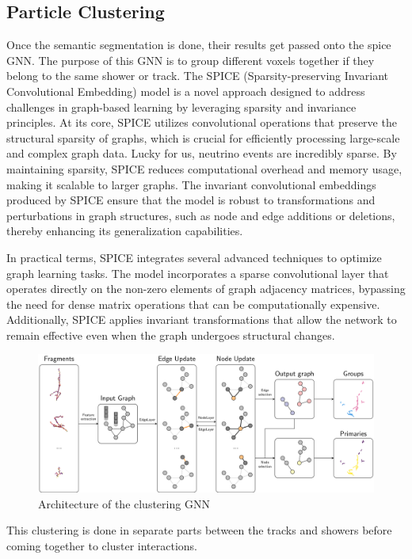 \subsection{Particle Clustering}

Once the semantic segmentation is done, their results get passed onto the spice GNN.
The purpose of this GNN is to group different voxels together if they belong to the same shower or track.
The SPICE (Sparsity-preserving Invariant Convolutional Embedding) model is a novel approach designed to address challenges in graph-based learning by leveraging sparsity and invariance principles.
At its core, SPICE utilizes convolutional operations that preserve the structural sparsity of graphs, which is crucial for efficiently processing large-scale and complex graph data.
Lucky for us, neutrino events are incredibly sparse.
By maintaining sparsity, SPICE reduces computational overhead and memory usage, making it scalable to larger graphs.
The invariant convolutional embeddings produced by SPICE ensure that the model is robust to transformations and perturbations in graph structures, such as node and edge additions or deletions, thereby enhancing its generalization capabilities.

In practical terms, SPICE integrates several advanced techniques to optimize graph learning tasks.
The model incorporates a sparse convolutional layer that operates directly on the non-zero elements of graph adjacency matrices, bypassing the need for dense matrix operations that can be computationally expensive.
Additionally, SPICE applies invariant transformations that allow the network to remain effective even when the graph undergoes structural changes.

\begin{figure}[H]
  \centering
  \includegraphics[width=120mm]{figures/gnn.png}
  \caption{Architecture of the clustering GNN}
  \label{gnn}
\end{figure}

This clustering is done in separate parts between the tracks and showers before coming together to cluster interactions.

